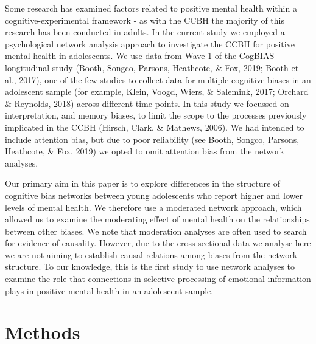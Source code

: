 \documentclass[
  english,
  man]{apa6}
\begin{document}
Some research has examined factors related to positive mental health within a cognitive-experimental framework - as with the CCBH the majority of this research has been conducted in adults. In the current study we employed a psychological network analysis approach to investigate the CCBH for positive mental health in adolescents. We use data from Wave 1 of the CogBIAS longitudinal study (Booth, Songco, Parsons, Heathcote, \& Fox, 2019; Booth et al., 2017), one of the few studies to collect data for multiple cognitive biases in an adolescent sample (for example, Klein, Voogd, Wiers, \& Salemink, 2017; Orchard \& Reynolds, 2018) across different time points. In this study we focussed on interpretation, and memory biases, to limit the scope to the processes previously implicated in the CCBH (Hirsch, Clark, \& Mathews, 2006). We had intended to include attention bias, but due to poor reliability (see Booth, Songco, Parsons, Heathcote, \& Fox, 2019) we opted to omit attention bias from the network analyses.

Our primary aim in this paper is to explore differences in the structure of cognitive bias networks between young adolescents who report higher and lower levels of mental health. We therefore use a moderated network approach, which allowed us to examine the moderating effect of mental health on the relationships between other biases. We note that moderation analyses are often used to search for evidence of causality. However, due to the cross-sectional data we analyse here we are not aiming to establish causal relations among biases from the network structure. To our knowledge, this is the first study to use network analyses to examine the role that connections in selective processing of emotional information plays in positive mental health in an adolescent sample.

\hypertarget{methods}{%
\section{Methods}\label{methods}}
\end{document}
